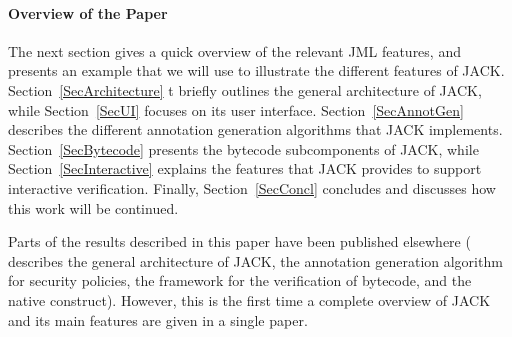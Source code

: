 \paragraph{Overview of the Paper}
The next section gives a quick overview of the relevant JML features,
and presents an example that we will use to illustrate the different
features of JACK. Section~\ref{SecArchitecture} t briefly outlines the
general architecture of JACK, while Section~\ref{SecUI} focuses on its
user interface. Section~\ref{SecAnnotGen} describes the different
annotation generation algorithms that JACK
implements. Section~\ref{SecBytecode} presents the bytecode
subcomponents of JACK, while Section~\ref{SecInteractive} explains the
features that JACK provides to support interactive
verification. Finally, Section~\ref{SecConcl} concludes and discusses
how this work will be continued.

Parts of the results described in this paper have been published
elsewhere (\cite{BurdyRL03} describes the general architecture of
JACK, \cite{PavlovaBBHL04cardis} the annotation generation algorithm
for security policies, \cite{BP06JSV} the framework for the
verification of bytecode, and \cite{Charles06} the native
construct). However, this is the first time a complete overview of
JACK and its main features are given in a single paper.


